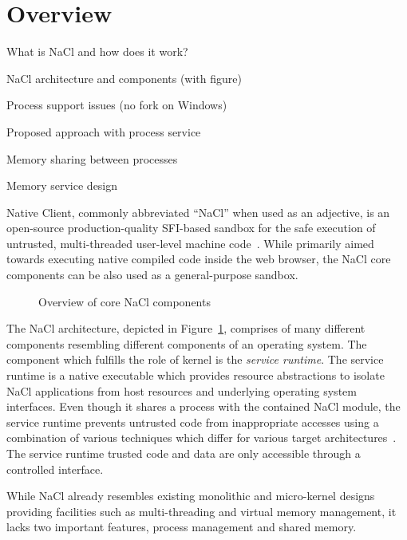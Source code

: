 \section{Overview}
\label{sec:overview}

\begin{structure}
  \item What is NaCl and how does it work?
  \item NaCl architecture and components (with figure)
  \item Process support issues (\eg no fork on Windows)
  \item Proposed approach with process service
  \item Memory sharing between processes
  \item Memory service design
\end{structure}

Native Client, commonly abbreviated ``NaCl'' when used as an adjective,
is an open-source production-quality SFI-based sandbox for the safe
execution of untrusted, multi-threaded user-level machine
code~\cite{yee:ieee-sp09,sehr:usenix-sec10,ansel:pldi11}. While
primarily aimed towards executing native compiled code inside the web
browser, the NaCl core components can be also used as a
general-purpose sandbox.

\begin{figure}
\centering
\caption{Overview of core NaCl components}
\label{fig:architecture}
\end{figure}


The NaCl architecture, depicted in Figure~\ref{fig:architecture},
comprises of many different components resembling different components
of an operating system. The component which fulfills the role of kernel
is the \emph{service runtime}.
The service runtime is a native executable which provides resource
abstractions to isolate NaCl applications from host resources and
underlying operating system interfaces. Even though it shares a process
with the contained NaCl module, the service runtime prevents untrusted
code from inappropriate accesses using a combination of various
techniques which differ for various target
architectures~\cite{yee:ieee-sp09,sehr:usenix-sec10}. The service
runtime trusted code and data are only accessible through a controlled
interface.

While NaCl already resembles existing monolithic and micro-kernel
designs providing facilities such as multi-threading and virtual memory
management, it lacks two important features, process management and
shared memory. 


